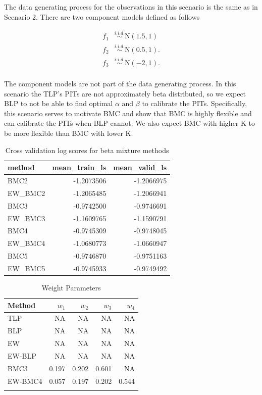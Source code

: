 \documentclass[
]{article}
\begin{document}
The data generating process for the observations in this scenario is the
same as in Scenario 2. There are two component models defined as follows

\[
\begin{aligned}
f_{1}&\overset{i.i.d.}{\sim}\text{N}(1.5,1)\\
f_{2}&\overset{i.i.d.}{\sim}\text{N}(0.5,1).\\
f_{3}&\overset{i.i.d.}{\sim}\text{N}(-2,1).\\
\end{aligned}
\]

The component models are not part of the data generating process. In
this scenario the TLP's PITs are not approximately beta distributed, so
we expect BLP to not be able to find optimal \(\alpha\) and \(\beta\) to
calibrate the PITs. Specifically, this scenario serves to motivate BMC
and show that BMC is highly flexible and can calibrate the PITs when BLP
cannot. We also expect BMC with higher K to be more flexible than BMC
with lower K.

\begin{table}[H]

\caption{\label{tab:unnamed-chunk-24}Cross validation log scores for beta mixture methods}
\centering
\fontsize{8}{10}\selectfont
\begin{tabular}[t]{l|r|r}
\hline
method & mean\_train\_ls & mean\_valid\_ls\\
\hline
BMC2 & -1.2073506 & -1.2066975\\
\hline
EW\_BMC2 & -1.2065485 & -1.2066941\\
\hline
BMC3 & -0.9742500 & -0.9746691\\
\hline
EW\_BMC3 & -1.1609765 & -1.1590791\\
\hline
BMC4 & -0.9745309 & -0.9748045\\
\hline
EW\_BMC4 & -1.0680773 & -1.0660947\\
\hline
BMC5 & -0.9746870 & -0.9751163\\
\hline
EW\_BMC5 & -0.9745933 & -0.9749492\\
\hline
\end{tabular}
\end{table}

\begin{table}[H]

\caption{\label{tab:unnamed-chunk-24}Weight Parameters}
\centering
\fontsize{8}{10}\selectfont
\begin{tabular}[t]{lrrrr}
\toprule{}
Method & $w_1$ & $w_2$ & $w_3$ & $w_4$\\
\midrule{}
TLP & NA & NA & NA & NA\\
BLP & NA & NA & NA & NA\\
EW & NA & NA & NA & NA\\
EW-BLP & NA & NA & NA & NA\\
BMC3 & 0.197 & 0.202 & 0.601 & NA\\
\addlinespace
EW-BMC4 & 0.057 & 0.197 & 0.202 & 0.544\\
\bottomrule{}
\end{tabular}
\end{table}
\end{document}
